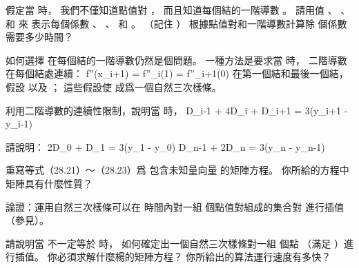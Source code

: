 \startigBase[a]\startitem
假定當  時，
我們不僅知道點值對 ，
而且知道每個結的一階導數 。
請用值 、 、  和  來
表示每個係數 、 、  和 。
（記住 ）
根據點值對和一階導數計算除  個係數需要多少時間？
\stopitem\stopigBase

\startANSWER
{}
\stopANSWER

如何選擇  在每個結的一階導數仍然是個問題。
一種方法是要求當  時，
二階導數在每個結處連續：
\startformula
f''(x_{i+1}) = f''_i(1) = f''_{i+1}(0)
\stopformula
在第一個結和最後一個結，
假設  以及 ；
這些假設使  成爲一個{\EMP 自然}三次樣條。

\startigBase[continue]\startitem
利用二階導數的連續性限制，說明當  時，
\startformula
D_{i-1} + 4D_i + D_{i+1} = 3(y_{i+1} - y_{i-1}) 
\stopformula
\stopitem\stopigBase

\startANSWER
{}
\stopANSWER

\startigBase[continue]\startitem
請說明：
\startformula\startmathalignment
\NC 2D_0 + D_1 \NC = 3(y_1 - y_0) \NR
\NC D_{n-1} + 2D_n \NC = 3(y_n - y_{n-1}) \NR
\stopmathalignment\stopformula
\stopitem\stopigBase

\startANSWER
{}
\stopANSWER

\startigBase[continue]\startitem
重寫等式（28.21）～（28.23）爲
包含未知量向量  的矩陣方程。
你所給的方程中矩陣具有什麼性質？
\stopitem\stopigBase

\startANSWER
{}
\stopANSWER

\startigBase[continue]\startitem
論證：運用自然三次樣條可以在  時間內對一組  個點值對組成的集合對
進行插值（參見）。
\stopitem\stopigBase

\startANSWER
{}
\stopANSWER

\startigBase[continue]\startitem
請說明當  不一定等於  時，
如何確定出一個自然三次樣條對一組  個點 
 （滿足 ）進行插值。
你必須求解什麼楊的矩陣方程？
你所給出的算法運行速度有多快？
\stopitem\stopigBase

\startANSWER
{}
\stopANSWER
\stopPROBLEM

\stopsubject%
